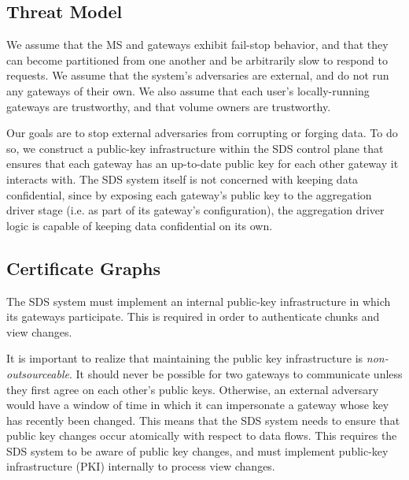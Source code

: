 \subsection{Threat Model}

We assume that the MS and gateways exhibit fail-stop behavior, and that they can
become partitioned from one another and be arbitrarily slow to respond to
requests.  We assume that the system's adversaries are external, and do not run
any gateways of their own.  We also assume that each user's locally-running
gateways are trustworthy, and that volume owners are trustworthy.

Our goals are to stop external adversaries from corrupting or forging
data.  To do so, we construct a public-key infrastructure within the SDS control
plane that ensures that each gateway has an up-to-date public key for each other
gateway it interacts with.  The SDS system itself is not concerned with keeping data
confidential, since by exposing each gateway's public key to the aggregation
driver stage (i.e. as part of its gateway's configuration),
the aggregation driver logic is capable of keeping data
confidential on its own.

\subsection{Certificate Graphs}

The SDS system must implement an internal public-key infrastructure in which its
gateways participate.  This is required in order to authenticate chunks and view
changes.

It is important to realize that maintaining the public key infrastructure is
\emph{non-outsourceable}.  It should never be possible for two
gateways to communicate unless they first agree on each other's public keys.
Otherwise, an external adversary would have a window of time in which it can
impersonate a gateway whose key has recently been changed.  This means that the
SDS system needs to ensure that public key changes occur atomically with respect
to data flows.  This requires the SDS system to be aware of public key changes,
and must implement public-key infrastructure (PKI) internally to 
process view changes.

